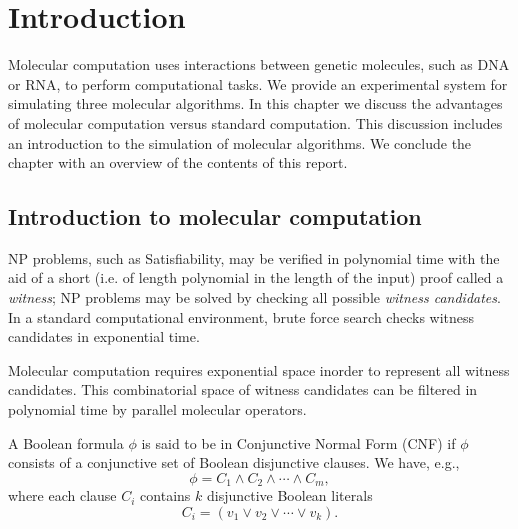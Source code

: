 \chapter{Introduction}


Molecular computation uses interactions between genetic molecules, such as DNA or RNA, to perform computational tasks.  We provide an experimental system for simulating three molecular algorithms.  In this chapter we discuss the advantages of molecular computation versus standard computation.  This discussion includes an introduction to the simulation of molecular algorithms.  We conclude the chapter with an overview of the contents of this report.

\section{Introduction to molecular computation}
	
				
\textsf{NP} problems, such as {\sc Satisfiability}, may be verified in polynomial time with the aid of a short (i.e. of length polynomial in the length of the input) proof called a \textit{witness}; \textsf{NP} problems may be solved by checking all possible \textit{witness candidates}.  In a standard computational environment, brute force search checks witness candidates in exponential time.

Molecular computation requires exponential space inorder to represent all witness candidates.  This combinatorial space of witness candidates can be filtered in polynomial time by parallel molecular operators.

A Boolean formula $\phi$ is said to be in Conjunctive Normal Form (CNF) if $\phi$ consists of a conjunctive set of Boolean disjunctive clauses.  We have, e.g.,
\[
\phi = C_1 \wedge C_2 \wedge \cdots \wedge C_m, 
\]
where each clause $C_i$ contains $k$ disjunctive Boolean literals
\[
C_i = (v_1 \vee v_2 \vee \cdots \vee v_k).
\]

